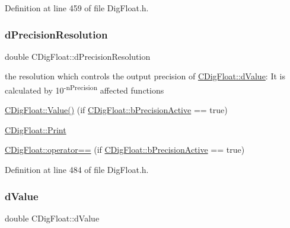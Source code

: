 Definition at line 459 of file Dig\+Float.\+h.

\mbox{\label{classCDigFloat_a7f9809fa0b25da57f5c8c18a02b7d1a7}} 
\subsubsection{\texorpdfstring{d\+Precision\+Resolution}{dPrecisionResolution}}
{\footnotesize\ttfamily double C\+Dig\+Float\+::d\+Precision\+Resolution\hspace{0.3cm}{\ttfamily [protected]}}



the resolution which controls the output precision of \hyperlink{classCDigFloat_a4bbe69e30dd4e20527362493aa9aaf96}{C\+Dig\+Float\+::d\+Value}\+: It is calculated by 10\textsuperscript{-\/n\+Precision} affected functions 


\begin{DoxyItemize}
\item \hyperlink{classCDigFloat_af74b8cd0935294b6371f551b7a1ff640}{C\+Dig\+Float\+::\+Value()} (if \hyperlink{classCDigFloat_aa1f6ed0312a2aa6ae5ee2abd195adefc}{C\+Dig\+Float\+::b\+Precision\+Active} == true)
\item \hyperlink{classCDigFloat_a80731e0970f607114d6d1bde4d02bd39}{C\+Dig\+Float\+::\+Print}
\item \hyperlink{classCDigFloat_ad8980d984bf2bab71d15b830fd0180a5}{C\+Dig\+Float\+::operator==} (if \hyperlink{classCDigFloat_aa1f6ed0312a2aa6ae5ee2abd195adefc}{C\+Dig\+Float\+::b\+Precision\+Active} == true) 
\end{DoxyItemize}

Definition at line 484 of file Dig\+Float.\+h.

\mbox{\label{classCDigFloat_a4bbe69e30dd4e20527362493aa9aaf96}} 
\subsubsection{\texorpdfstring{d\+Value}{dValue}}
{\footnotesize\ttfamily double C\+Dig\+Float\+::d\+Value\hspace{0.3cm}{\ttfamily [protected]}}



